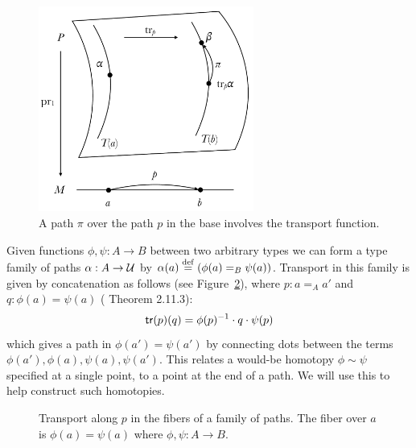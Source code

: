 \begin{figure}[H]
\centering
\includegraphics[width=200pt]{figs/pathovers.pdf}
\caption{A path \( \pi \) over the path \( p \) in the base involves the transport function.}
\label{fig:pathovers}
\end{figure}

Given functions \( \phi,\psi:A\to B \) between two arbitrary types we can form a type family of paths \( \alpha:A\to\mathcal{U} \) by \( \alpha(a)\stackrel{\mathrm{def}}{=}(\phi(a)=_B\psi(a)) \). Transport in this family is given by concatenation as follows (see Figure~\ref{fig:transport_family_of_paths}), where \( p:a=_A a' \) and \( q:\phi(a)=\psi(a) \) (\cite{hottbook} Theorem 2.11.3):
\[ 
\mathsf{tr}(p)(q) = \phi(p)^{-1}\cdot q\cdot \psi(p)
\]
which gives a path in \( \phi(a')=\psi(a') \) by connecting dots between the terms \( \phi(a'), \phi(a), \psi(a), \psi(a') \). This relates a would-be homotopy \( \phi\sim\psi \) specified at a single point, to a point at the end of a path. We will use this to help construct such homotopies.
\begin{figure}[h]
\centering
{}
\caption{Transport along \( p \) in the fibers of a family of paths. The fiber over \( a \) is \( \phi(a)=\psi(a) \) where \( \phi,\psi:A\to B \).}
\label{fig:transport_family_of_paths}
\end{figure}

